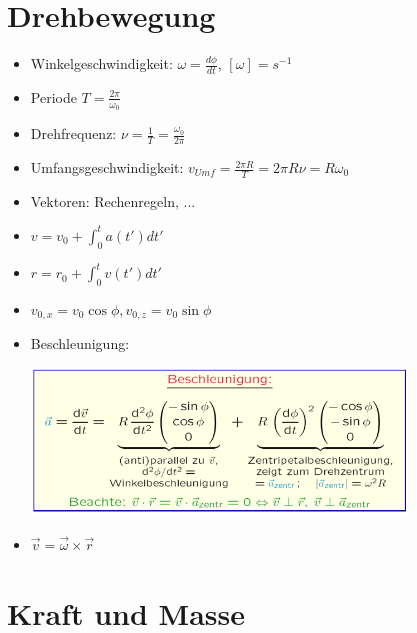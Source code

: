 \documentclass[a4paper,10pt, fleqn]{article}
\begin{document}
\section{Drehbewegung}
\label{sec:drehbewegung}
\begin{itemize}
\item Winkelgeschwindigkeit: $\omega = \frac{d\phi}{dt}$, $[\omega] = s^{-1}$
\item Periode $T = \frac{2\pi}{\omega_{0}}$
\item Drehfrequenz: $\nu = \frac{1}{T} = \frac{\omega_0}{2\pi}$
\item Umfangsgeschwindigkeit: $v_{Umf} = \frac{2\pi R}{T} = 2\pi R\nu = R \omega_0$
\item Vektoren: Rechenregeln, ...
\item $v = v_0 + \int_0^ta(t')dt'$
\item $r = r_0 + \int_0^tv(t')dt'$
\item $v_{0,x} = v_0\cos \phi, v_{0, z} = v_0 \sin \phi$
\item Beschleunigung:

\includegraphics[width=10cm]{Beschleunigung}
\item $\vec{v} = \vec{\omega} \times \vec{r}$
\end{itemize}

\section{Kraft und Masse}
\label{sec:kraft-und-masse}
\end{document}
